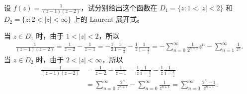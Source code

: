 \documentclass[../../main.tex]{subfiles}%
\begin{document}
\begin{example}
设 \( f(z) = \frac{1}{(z - 1)(z - 2)} \)，试分别给出这个函数在 \( D_1 = \{ z: 1 < |z| < 2 \} \) 和 \( D_2 = \{ z: 2 < |z| < \infty \} \) 上的 Laurent 展开式。
\end{example}
\begin{solution}
当 \( z \in D_1 \) 时，由于 \( 1 < |z| < 2 \)，所以
\begin{align*}
\frac{1}{(z - 1)(z - 2)} = \frac{1}{z - 2} - \frac{1}{z - 1} = -\frac{1}{2} \frac{1}{1 - \frac{z}{2}} - \frac{1}{z} \frac{1}{1 - \frac{1}{z}} = -\sum_{n = 0}^{\infty} \frac{1}{2^{n + 1}} z^n - \sum_{n = 1}^{\infty} \frac{1}{z^n}.
\end{align*}
当 \( z \in D_2 \) 时，由于 \( 2 < |z| < \infty \)，所以
\begin{align*}
\frac{1}{(z - 1)(z - 2)} &= \frac{1}{z - 2} - \frac{1}{z - 1} = \frac{1}{z} \frac{1}{1 - \frac{2}{z}} - \frac{1}{z} \frac{1}{1 - \frac{1}{z}} \\
&= \sum_{n = 0}^{\infty} \frac{2^n}{z^{n + 1}} - \sum_{n = 0}^{\infty} \frac{1}{z^{n + 1}} = \sum_{n = 0}^{\infty} \frac{2^n - 1}{z^{n + 1}}.
\end{align*}

\end{solution}
\end{document}
